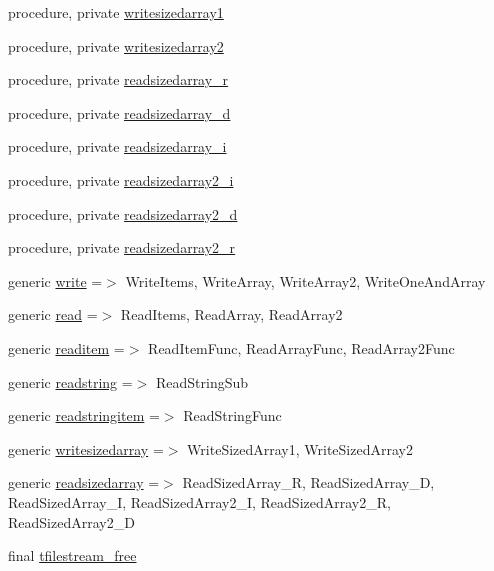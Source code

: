 \begin{DoxyCompactItemize}
procedure, private \mbox{\hyperlink{structfileutils_1_1tfilestream_a9057a3261b056d7077da124910b6eaf5}{writesizedarray1}}
\item 
procedure, private \mbox{\hyperlink{structfileutils_1_1tfilestream_a346b0cfc115ec63f86c430f446324ec9}{writesizedarray2}}
\item 
procedure, private \mbox{\hyperlink{structfileutils_1_1tfilestream_a613ca3ff702a8d474c38548b35fcf7d5}{readsizedarray\+\_\+r}}
\item 
procedure, private \mbox{\hyperlink{structfileutils_1_1tfilestream_ab728b7911d414d35da9b794e86e23a42}{readsizedarray\+\_\+d}}
\item 
procedure, private \mbox{\hyperlink{structfileutils_1_1tfilestream_aa7542ad55c8ac9224e41e6eac9f750b9}{readsizedarray\+\_\+i}}
\item 
procedure, private \mbox{\hyperlink{structfileutils_1_1tfilestream_a957f5714f61191d2305dd6fc2b83f876}{readsizedarray2\+\_\+i}}
\item 
procedure, private \mbox{\hyperlink{structfileutils_1_1tfilestream_a1fb9897ce42b6845f69078c0c2683af2}{readsizedarray2\+\_\+d}}
\item 
procedure, private \mbox{\hyperlink{structfileutils_1_1tfilestream_a7acdb8ad17387166c1e42eb5fba2bc28}{readsizedarray2\+\_\+r}}
\item 
generic \mbox{\hyperlink{structfileutils_1_1tfilestream_afac6692bb5fad57e18abea90570da6d3}{write}} =$>$ Write\+Items, Write\+Array, Write\+Array2, Write\+One\+And\+Array
\item 
generic \mbox{\hyperlink{structfileutils_1_1tfilestream_a3eba218f4da08feade1f6fe889f82332}{read}} =$>$ Read\+Items, Read\+Array, Read\+Array2
\item 
generic \mbox{\hyperlink{structfileutils_1_1tfilestream_ab89590f13c1bb79768c5987387cd0f15}{readitem}} =$>$ Read\+Item\+Func, Read\+Array\+Func, Read\+Array2\+Func
\item 
generic \mbox{\hyperlink{structfileutils_1_1tfilestream_a93683194f64760a507d8b22afb0d311b}{readstring}} =$>$ Read\+String\+Sub
\item 
generic \mbox{\hyperlink{structfileutils_1_1tfilestream_a256bf925db8f74144f916aa3a23f11d9}{readstringitem}} =$>$ Read\+String\+Func
\item 
generic \mbox{\hyperlink{structfileutils_1_1tfilestream_a23afbcc24ec6b7198f05dd16a8cec4e3}{writesizedarray}} =$>$ Write\+Sized\+Array1, Write\+Sized\+Array2
\item 
generic \mbox{\hyperlink{structfileutils_1_1tfilestream_a0fe6ab4d7f178d8cdacb98806db99fdb}{readsizedarray}} =$>$ Read\+Sized\+Array\+\_\+R, Read\+Sized\+Array\+\_\+D, Read\+Sized\+Array\+\_\+I, Read\+Sized\+Array2\+\_\+I, Read\+Sized\+Array2\+\_\+R, Read\+Sized\+Array2\+\_\+D
\item 
final \mbox{\hyperlink{structfileutils_1_1tfilestream_ab3041e1c0b828404ec22a934f90244f1}{tfilestream\+\_\+free}}
\end{DoxyCompactItemize}
